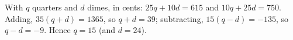 With $q$ quarters and $d$ dimes, in cents: $25q+10d=615$ and $10q+25d=750$. Adding, $35(q+d)=1365$, so $q+d=39$; subtracting, $15(q-d)=-135$, so $q-d=-9$. Hence $q=\boxed{15}$ (and $d=24$).
